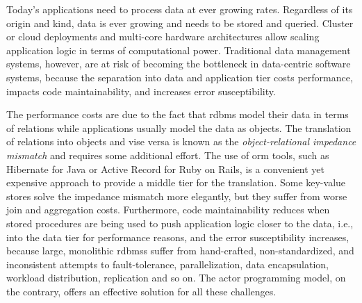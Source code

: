 
  Today's applications need to process data at ever growing rates.
  Regardless of its origin and kind, data is ever growing and needs to be stored and queried.
  Cluster or cloud deployments and multi-core hardware architectures allow scaling application logic in terms of computational power.
  Traditional data management systems, however, are at risk of becoming the bottleneck in data-centric software systems, because the separation into data and application tier costs performance, impacts code maintainability, and increases error susceptibility.

  The performance costs are due to the fact that \gls{rdbms} model their data in terms of relations while applications usually model the data as objects.
  The translation of relations into objects and vise versa is known as the \emph{object-relational impedance mismatch} and requires some additional effort.
  The use of \gls{orm} tools, such as Hibernate for Java or Active Record for Ruby on Rails, is a convenient yet expensive approach to provide a middle tier for the translation. Some key-value stores solve the impedance mismatch more elegantly, but they suffer from worse join and aggregation costs. Furthermore, code maintainability reduces when stored procedures are being used to push application logic closer to the data, {i.e.}, into the data tier for performance reasons, and the error susceptibility increases, because large, monolithic \glspl{rdbms} suffer from hand-crafted, non-standardized, and inconsistent attempts to fault-tolerance, parallelization, data encapsulation, workload distribution, replication and so on. The actor programming model, on the contrary, offers an effective solution for all these challenges.

